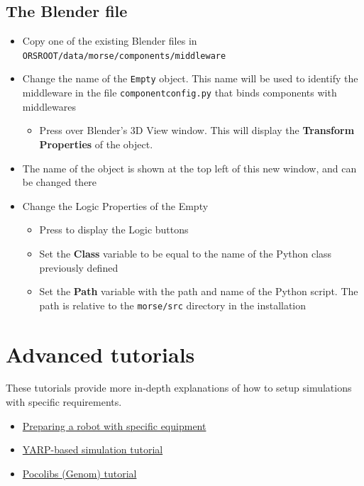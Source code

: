 \documentclass[twoside,a4paper,10pt]{report}
\newcommand{\key}[1]{\fcolorbox{Dark}{Light}{\textbf{#1}}}
\newcommand{\dokutitlelevelone}[1]{\chapter{#1}}
\newcommand{\dokutitleleveltwo}[1]{\section{#1}}
\newcommand{\dokubold}[1]{\textbf{#1}}
\newcommand{\dokumonospace}[1]{\texttt{#1}}
\newcommand{\dokuitem}{\item}
\begin{document}
\dokutitleleveltwo{The Blender file}
\label{a22b5e3241d0ad2ab4f289b4afb21de7}%

\begin{itemize}
\dokuitem  Copy one of the existing Blender files in \dokumonospace{{\textdollar}ORS{\textunderscore}ROOT/data/morse/components/middleware}
\end{itemize}

\begin{itemize}
\dokuitem  Change the name of the \dokumonospace{Empty} object. This name will be used to identify the middleware in the file \dokumonospace{component{\textunderscore}config.py} that binds components with middlewares
\begin{itemize}
\dokuitem  Press \key{N} over Blender's 3D View window. This will display the \dokubold{Transform Properties} of the object.
\end{itemize}

\dokuitem  The name of the object is shown at the top left of this new window, and can be changed there
\end{itemize}

\begin{itemize}
\dokuitem  Change the Logic Properties of the Empty
\begin{itemize}
\dokuitem  Press \key{F4} to display the Logic buttons
\dokuitem  Set the \dokubold{Class} variable to be equal to the name of the Python class previously defined
\dokuitem  Set the \dokubold{Path} variable with the path and name of the Python script. The path is relative to the \dokumonospace{morse/src} directory in the installation
\end{itemize}

\end{itemize}
\dokutitlelevelone{Advanced tutorials}
\label{1db3103f04a8f50e1168ef3c23748f71}%
\label{1db3103f04a8f50e1168ef3c23748f71}%

These tutorials provide more in-depth explanations of how to setup simulations with specific requirements.



\begin{itemize}
\dokuitem  \hyperref[feb94730bf2c8bc6803a472bb56691ae]{ Preparing a robot with specific equipment}
\dokuitem  \hyperref[1dd029a60f7f3dd1deaf993ce4538edf]{ YARP-based simulation tutorial}
\dokuitem  \hyperref[5c7d3aeca93d2be4626b023df992dc1d]{ Pocolibs (Genom) tutorial}
\end{itemize}
\end{document}
